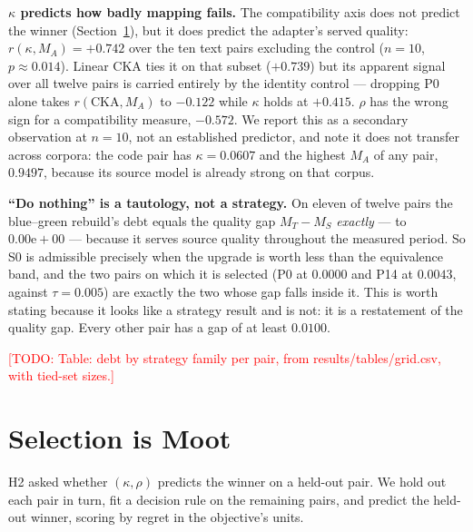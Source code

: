 \documentclass[conference]{IEEEtran}
\newcommand{\todo}[1]{\textcolor{red}{[TODO: #1]}}
\newcommand{\debt}{\mathrm{debt}}
\begin{document}
\textbf{$\kappa$ predicts how badly mapping fails.} The compatibility axis does not
predict the winner (Section~\ref{sec:select}), but it does predict the adapter's served
quality: $r(\kappa, M_A) = +0.742$ over the ten text pairs excluding the control
($n = 10$, $p \approx 0.014$). Linear CKA ties it on that subset ($+0.739$) but its
apparent signal over all twelve pairs is carried entirely by the identity control ---
dropping P0 alone takes $r(\mathrm{CKA}, M_A)$ to $-0.122$ while $\kappa$ holds at
$+0.415$. $\rho$ has the wrong sign for a compatibility measure, $-0.572$. We report this
as a secondary observation at $n = 10$, not an established predictor, and note it does
not transfer across corpora: the code pair has $\kappa = 0.0607$ and the highest $M_A$ of
any pair, $0.9497$, because its source model is already strong on that corpus.

\textbf{``Do nothing'' is a tautology, not a strategy.} On eleven of twelve pairs the
blue--green rebuild's $\debt$ equals the quality gap $M_T - M_S$ \emph{exactly} --- to
$0.00\mathrm{e}{+}00$ --- because it serves source quality throughout the measured period.
So S0 is admissible precisely when the upgrade is worth less than the equivalence band,
and the two pairs on which it is selected (P0 at $0.0000$ and P14 at $0.0043$, against
$\tau = 0.005$) are exactly the two whose gap falls inside it. This is worth stating
because it looks like a strategy result and is not: it is a restatement of the quality
gap. Every other pair has a gap of at least $0.0100$.

\todo{Table: $\debt$ by strategy family per pair, from results/tables/grid.csv, with
tied-set sizes.}

\section{Selection is Moot}\label{sec:select}

H2 asked whether $(\kappa, \rho)$ predicts the winner on a held-out pair. We hold out
each pair in turn, fit a decision rule on the remaining pairs, and predict the held-out
winner, scoring by regret in the objective's units.
\end{document}
